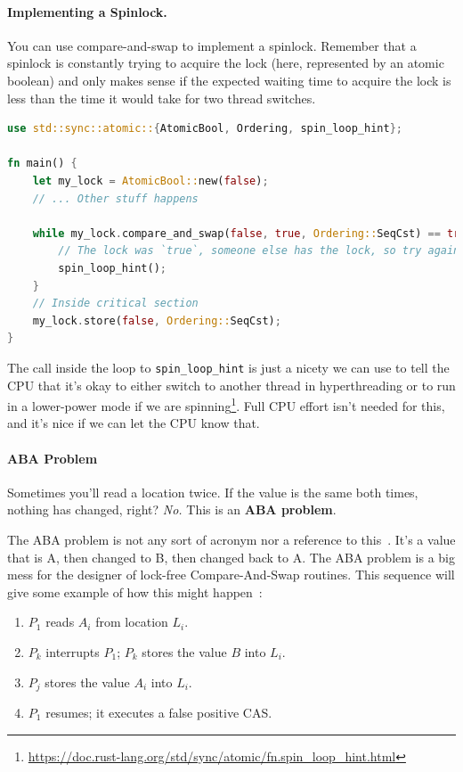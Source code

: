 \documentclass[a4paper]{report}
\begin{document}
\paragraph{Implementing a Spinlock.}
You can use compare-and-swap to implement a spinlock. Remember that a spinlock is constantly trying to acquire the lock (here, represented by an atomic boolean) and only makes sense if the expected waiting time to acquire the lock is less than the time it would take for two thread switches.

\begin{lstlisting}[language=Rust]
use std::sync::atomic::{AtomicBool, Ordering, spin_loop_hint};

fn main() {
    let my_lock = AtomicBool::new(false);
    // ... Other stuff happens

    while my_lock.compare_and_swap(false, true, Ordering::SeqCst) == true {
        // The lock was `true`, someone else has the lock, so try again
        spin_loop_hint();
    }
    // Inside critical section
    my_lock.store(false, Ordering::SeqCst);
}
  \end{lstlisting}

The call inside the loop to \texttt{spin\_loop\_hint} is just a nicety we can use to tell the CPU that it's okay to either switch to another thread in hyperthreading or to run in a lower-power mode if we are spinning\footnote{\url{https://doc.rust-lang.org/std/sync/atomic/fn.spin_loop_hint.html}}. Full CPU effort isn't needed for this, and it's nice if we can let the CPU know that. 

\paragraph{ABA Problem}
Sometimes you'll read a location twice. If the value is the same both times, nothing has changed, right? \emph{No.} This is an {\bf ABA problem}.

The ABA problem is not any sort of acronym nor a reference to this~\cite{abba}. It's a value that is A, then changed to B, then changed back to A. The ABA problem is a big mess for the designer of lock-free Compare-And-Swap routines. This sequence will give some example of how this might happen~\cite{abaproblem}:

\begin{enumerate}
	\item $P_{1}$ reads $A_{i}$ from location $L_{i}$.
	\item $P_{k}$ interrupts $P_{1}$; $P_{k}$ stores the value $B$ into $L_{i}$.
	\item $P_{j}$ stores the value $A_{i}$ into $L_{i}$.
	\item $P_{1}$ resumes; it executes a false positive CAS.
\end{enumerate} 
\end{document}
